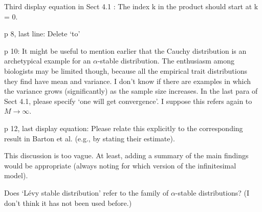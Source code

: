 \reply{
}

\begin{point}{\revref}
Third display equation in Sect 4.1 \revref: The index k in the product should start at k = 0.
\end{point}


\begin{point}{\revref}
p 8, last line: Delete ‘to’
\end{point}


\begin{point}{}
p 10: It might be useful to mention earlier that the Cauchy distribution is an archetypical
example for an $\alpha$-stable distribution. The enthusiasm among biologists may be limited
though, because all the empirical trait distributions they find have mean and variance. I
don’t know if there are examples in which the variance grows (significantly) as the sample
size increases. In the last para of Sect 4.1, please specify ‘one will get convergence’. I
suppose this refers again to $M \to \infty$.
\end{point}

\reply{
}

\begin{point}{}
p 12, last display equation: Please relate this explicitly to the corresponding result in
Barton et al. (e.g., by stating their estimate).
\end{point}

\reply{
}

\begin{point}{\revref}
This discussion is too vague. At least, adding a summary of the main findings
would be appropriate (always noting for which version of the infinitesimal model).
\end{point}


\begin{point}{\revref}
Does ‘Lévy stable distribution’ refer to the family of $\alpha$-stable
distributions? (I don’t think it has not been used before.)
\end{point}

